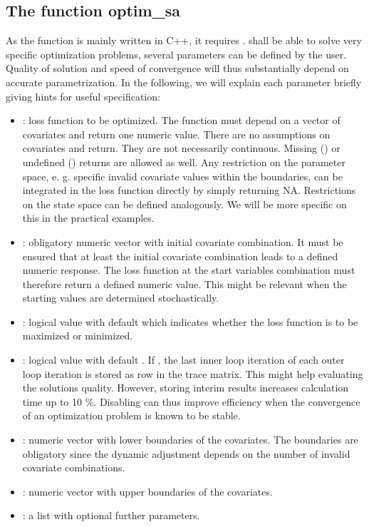 \subsection{The function optim\_sa}
As the function is mainly written in C++, it requires .  shall be able to solve very specific optimization problems, several parameters can be defined by the user. Quality of solution and speed of convergence will thus substantially depend on accurate parametrization. In the following, we will explain each parameter briefly giving hints for useful specification:
\begin{itemize}
	\item {}: loss function to be optimized. The function must depend on a vector of covariates and return one numeric value. There are no assumptions on covariates and return. They are not necessarily continuous. Missing () or undefined () returns are allowed as well. Any restriction on the parameter space, e. g. specific invalid covariate values within the boundaries, can be integrated in the loss function directly by simply returning NA. Restrictions on the state space can be defined analogously. We will be more specific on this in the practical examples.
	\item {}: obligatory numeric vector with initial covariate combination. It must be ensured that at least the initial covariate combination leads to a defined numeric response. The loss function at the start variables combination must therefore return a defined numeric value. This might be relevant when the starting values are determined stochastically.
	\item {}: logical value with default  which indicates whether the loss function is to be maximized or minimized.
	\item {}: logical value with default . If , the last inner loop iteration of each outer loop iteration is stored as row in the trace matrix. This might help evaluating the solutions quality. However, storing interim results increases calculation time up to 10 \%. Disabling  can thus improve efficiency when the convergence of an optimization problem is known to be stable.
	\item {}: numeric vector with lower boundaries of the covariates. The boundaries are obligatory since the dynamic  adjustment \citep{corana_1987, pronzato_1984} depends on the number of invalid covariate combinations.
	\item {}: numeric vector with upper boundaries of the covariates.
	\item {}: a list with optional further parameters.
\end{itemize}

